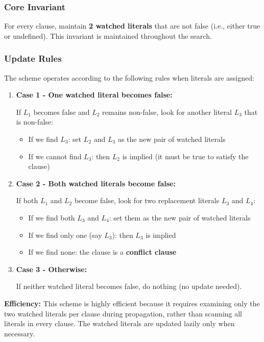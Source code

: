 \documentclass[11pt,a4paper]{article}
\theoremstyle{definition}
\theoremstyle{plain}
\theoremstyle{remark}
\begin{document}
\subsubsection{Core Invariant}

For every clause, maintain \textbf{2 watched literals} that are not false (i.e., either true or undefined). This invariant is maintained throughout the search.

\subsubsection{Update Rules}

The scheme operates according to the following rules when literals are assigned:

\begin{enumerate}
    \item \textbf{Case 1 - One watched literal becomes false:}
    
    If $L_1$ becomes false and $L_2$ remains non-false, look for another literal $L_3$ that is non-false:
    \begin{itemize}
        \item If we find $L_3$: set $L_2$ and $L_3$ as the new pair of watched literals
        \item If we cannot find $L_3$: then $L_2$ is implied (it must be true to satisfy the clause)
    \end{itemize}
    
    \item \textbf{Case 2 - Both watched literals become false:}
    
    If both $L_1$ and $L_2$ become false, look for two replacement literals $L_3$ and $L_4$:
    \begin{itemize}
        \item If we find both $L_3$ and $L_4$: set them as the new pair of watched literals
        \item If we find only one (say $L_3$): then $L_3$ is implied
        \item If we find none: the clause is a \textbf{conflict clause}
    \end{itemize}
    
    \item \textbf{Case 3 - Otherwise:}
    
    If neither watched literal becomes false, do nothing (no update needed).
\end{enumerate}

\textbf{Efficiency:} This scheme is highly efficient because it requires examining only the two watched literals per clause during propagation, rather than scanning all literals in every clause. The watched literals are updated lazily only when necessary.
\end{document}
